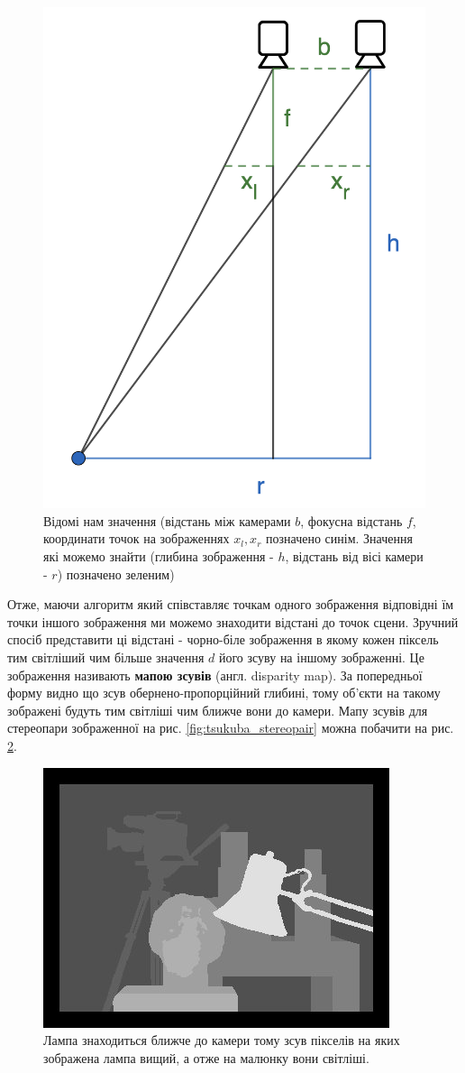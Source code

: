 \documentclass{article}
\theoremstyle{definition}
\begin{document}
\begin{figure}[h]
	\includegraphics[width=0.7\linewidth]{triangulation_with_cameras}
	\centering
	\caption{Відомі нам значення (відстань між камерами $b$, фокусна відстань $f$, координати точок на зображеннях $x_l, x_r$ позначено синім. Значення які можемо знайти (глибина зображення - $h$, відстань від вісі камери - $r$) позначено зеленим)}
	\label{fig:tirangulation_showcase}
\end{figure}

Отже, маючи алгоритм який співставляє точкам одного зображення відповідні їм точки іншого зображення ми можемо знаходити відстані до точок сцени. Зручний спосіб представити ці відстані - чорно-біле зображення в якому кожен піксель тим світліший чим більше значення $d$ його зсуву на іншому зображенні. Це зображення називають \textbf{мапою зсувів} (англ. disparity map). За попередньої форму видно що зсув обернено-пропорційний глибині, тому об'єкти на такому зображені будуть тим світліші чим ближче вони до камери. Мапу зсувів для стереопари зображенної на рис. \ref{fig:tsukuba_stereopair} можна побачити на рис. \ref{fig:tsukuba_disparity}. 

\begin{figure}[h]
	\includegraphics[width=0.5\linewidth]{disparity_map_example}
	\centering
	\caption{Лампа знаходиться ближче до камери тому зсув пікселів на яких зображена лампа вищий, а отже на малюнку вони світліші.}
	\label{fig:tsukuba_disparity}
\end{figure}
\end{document}

